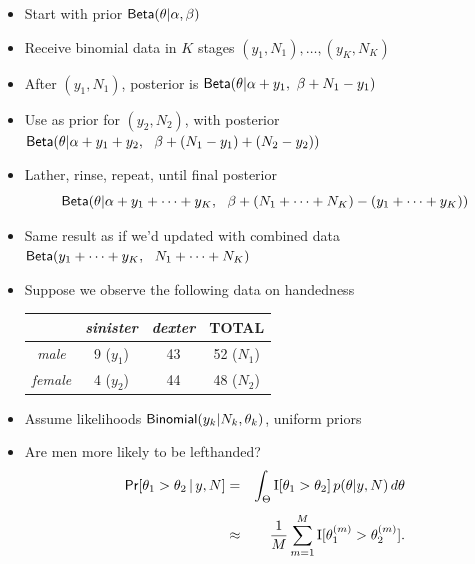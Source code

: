 \documentclass[10pt]{report}
\begin{document}
%
\vspace*{-4pt}
\begin{itemize}
\item Start with prior $\text{\sf Beta}(\theta|\alpha,\beta)$
\item Receive binomial data in $K$ stages $(y_1, N_1), \ldots, (y_K, N_K)$
\item After $(y_1,N_1)$, posterior is
  $\text{\sf Beta}(\theta|\alpha + y_1, \ \beta + N_1 - y_1)$
\item Use as prior for $(y_2,N_2)$, with posterior \\[3pt]
  $\distro{Beta}(\theta|\alpha + y_1 + y_2, \ \ \beta + (N_1 -
  y_1) + (N_2 - y_2))$
\item Lather, rinse, repeat, until final posterior
\[
\text{\sf Beta}(\theta|\alpha + y_1 + \cdots + y_K, \ \ \beta + (N_1 +
\cdots + N_K) - (y_1 + \cdots + y_K))
\]
\item Same result as if we'd updated with combined data \\[3pt]
$\text{\sf Beta}(y_1 + \cdots + y_K, \ \ N_1 + \cdots + N_K)$
\end{itemize}




%
\vspace*{-4pt}
\begin{itemize}
\item Suppose we observe the following data on handedness
\begin{center}
{\small
\begin{tabular}{c|c|c||c}
     & {\slshape sinister} & {\slshape dexter} & TOTAL
\\ \hline \hline
{\slshape male} & 9 ($y_1$) & 43 & 52 ($N_1$)
\\
{\slshape female} & 4 ($y_2$) & 44 & 48 ($N_2$)
\end{tabular}
}
\end{center}
\item Assume likelihoods $\text{\sf Binomial}(y_k|N_k,\theta_k)$, uniform
  priors
\item Are men more likely to be lefthanded?
{\small
\begin{eqnarray*}
\text{\sf Pr}[\theta_1 > \theta_2 \, | \, y, N]
& = &
\int_{\Theta} \text{I}[\theta_1 > \theta_2] \, p(\theta|y,N) \,
d\theta
\\[4pt]
& \approx & \frac{1}{M} \sum_{m=1}^M \text{I}[\theta_1^{(m)} > \theta_2^{(m)}].
\end{eqnarray*}
}
\end{itemize}
\end{document}
